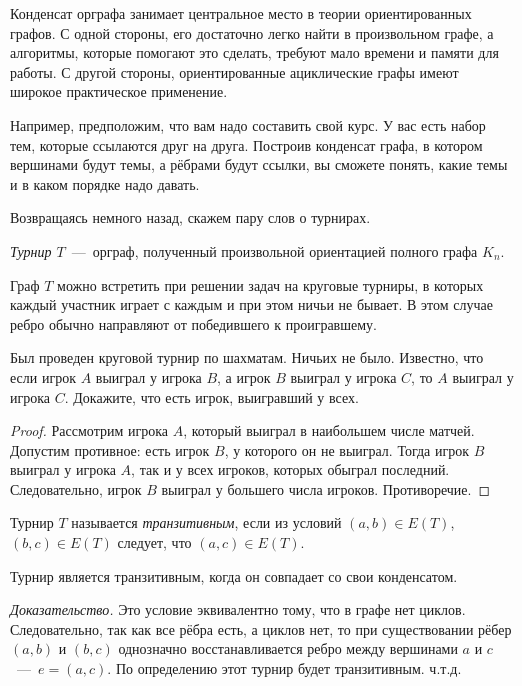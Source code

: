 	Конденсат орграфа занимает центральное место в теории ориентированных графов. С одной стороны, его достаточно легко 
	найти в произвольном графе, а алгоритмы, которые помогают это сделать, требуют мало времени и памяти для работы. 
	С другой стороны, ориентированные ациклические графы имеют широкое практическое применение. 
	
	Например, предположим, что вам надо составить свой курс. У вас есть набор тем, которые ссылаются друг на друга. 
	Построив конденсат графа, в котором вершинами будут темы, а рёбрами будут ссылки, вы сможете понять, какие темы 
	и в каком порядке надо давать.

	Возвращаясь немного назад, скажем пару слов о турнирах.
	
	
\begin{definition}
	\emph{Турнир $T$}~---~орграф, полученный произвольной ориентацией полного графа $K_n$.
\end{definition}

	Граф $T$ можно встретить при решении задач на круговые турниры, в которых каждый участник играет с каждым и 
	при этом ничьи не бывает. В этом случае ребро обычно направляют от победившего к проигравшему.
	
\begin{example}
	Был проведен круговой турнир по шахматам. Ничьих не было. Известно, что если игрок $A$ выиграл у игрока $B$, 
	а игрок $B$ выиграл у игрока $C$, то $A$ выиграл у игрока $C$. Докажите, что есть игрок, выигравший у всех.

\begin{proof}	
	Рассмотрим игрока $A$, который выиграл в наибольшем числе матчей. Допустим противное: есть игрок $B$, 
	у которого он не выиграл. Тогда игрок $B$ выиграл у игрока $A$, так и у всех игроков, которых обыграл последний. 
	Следовательно, игрок $B$ выиграл у большего числа игроков. Противоречие.
\end{proof}
\end{example}

\begin{definition}
	Турнир $T$ называется \emph{транзитивным}, если из условий $(a, b) \in E(T)$, $(b, c) \in E(T)$ следует, что $(a, c) \in E(T)$.
\end{definition}

\begin{statement}
	Турнир является транзитивным, когда он совпадает со свои конденсатом.
	
	\emph{Доказательство.} Это условие эквивалентно тому, что в графе нет циклов. Следовательно, так как все рёбра есть, 
	а циклов нет, то при существовании рёбер $(a, b)$ и $(b, c)$ однозначно восстанавливается ребро между 
	вершинами $a$ и $c$~---~$e = (a, c)$. По определению этот турнир будет транзитивным. ч.т.д.
\end{statement}


